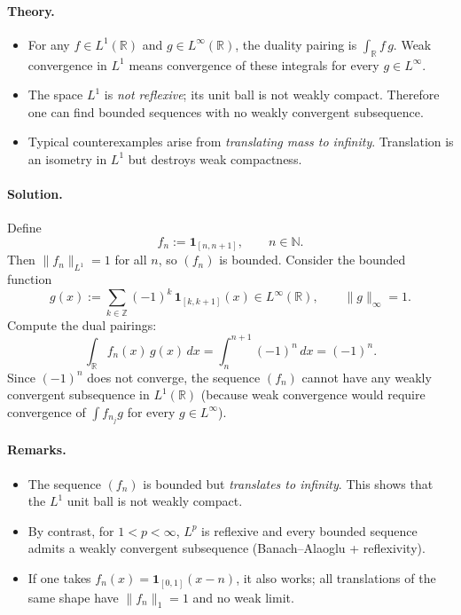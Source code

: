 \documentclass[12pt,a4paper]{article}
\theoremstyle{plain}
\theoremstyle{definition}
\theoremstyle{remark}
\theoremstyle{remark}
\theoremstyle{definition}
\begin{document}
	\paragraph{Theory.}
	\begin{itemize}
		\item For any $f\in L^1(\mathbb R)$ and $g\in L^\infty(\mathbb R)$,
		the duality pairing is $\displaystyle \int_{\mathbb R} f\,g$.
		Weak convergence in $L^1$ means convergence of these integrals
		for every $g\in L^\infty$.
		\item The space $L^1$ is \emph{not reflexive}; its unit ball is not weakly compact.
		Therefore one can find bounded sequences with no weakly convergent subsequence.
		\item Typical counterexamples arise from \emph{translating mass to infinity}.
		Translation is an isometry in $L^1$ but destroys weak compactness.
	\end{itemize}
	
	\paragraph{Solution.}
	Define
	\[
	f_n := \mathbf 1_{[n,n+1]} , \qquad n\in\mathbb N.
	\]
	Then $\|f_n\|_{L^1}=1$ for all $n$, so $(f_n)$ is bounded.
	Consider the bounded function
	\[
	g(x) := \sum_{k\in\mathbb Z} (-1)^k\,\mathbf 1_{[k,k+1]}(x)
	\in L^\infty(\mathbb R), \qquad \|g\|_\infty=1 .
	\]
	Compute the dual pairings:
	\[
	\int_{\mathbb R} f_n(x)\,g(x)\,dx
	= \int_{n}^{n+1} (-1)^n\,dx
	= (-1)^n.
	\]
	Since $(-1)^n$ does not converge, the sequence $(f_n)$ cannot have any weakly convergent
	subsequence in $L^1(\mathbb R)$ (because weak convergence would require convergence of
	$\int f_{n_j} g$ for every $g\in L^\infty$).
	
	\paragraph{Remarks.}
	\begin{itemize}
		\item The sequence $(f_n)$ is bounded but \emph{translates to infinity}.
		This shows that the $L^1$ unit ball is not weakly compact.
		\item By contrast, for $1<p<\infty$, $L^p$ is reflexive and every bounded sequence
		admits a weakly convergent subsequence (Banach–Alaoglu + reflexivity).
		\item If one takes $f_n(x)=\mathbf 1_{[0,1]}(x-n)$, it also works;
		all translations of the same shape have $\|f_n\|_1=1$ and no weak limit.
	\end{itemize}
	
\end{document}
